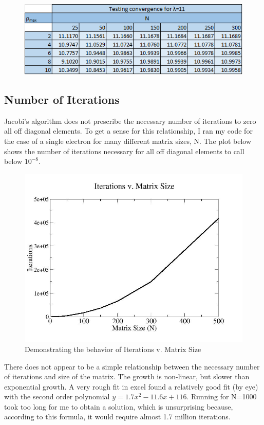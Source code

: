 \documentclass[%
oneside,                 %
final,                   %
10pt]{article}
\begin{document}
\begin{figure}[H]\label{fig:11}
  \centering
    \includegraphics[width=1.1\textwidth]{11.png}
\end{figure}

\subsection{Number of Iterations}

Jacobi's algorithm does not prescribe the necessary number of iterations to zero all off diagonal elements.  To get a sense for this relationship, I ran my code for the case of a single electron for many different matrix sizes, N.  The plot below shows the number of iterations necessary for all off diagonal elements to call below $10^{-8}$.

\begin{figure}[H]\label{fig:iteration}
  \centering
    \includegraphics[width=1.1\textwidth]{iterationplot.jpg}
    \caption{Demonstrating the behavior of Iterations v. Matrix Size}
\end{figure}

There does not appear to be a simple relationship between the necessary number of iterations and size of the matrix.  The growth is non-linear, but slower than exponential growth.  A very rough fit in excel found a relatively good fit (by eye) with the second order polynomial $y = 1.7 x^2 - 11.6 x + 116$.  Running for N=1000 took too long for me to obtain a solution, which is unsurprising because, according to this formula, it would require almost 1.7 million iterations.
\end{document}
